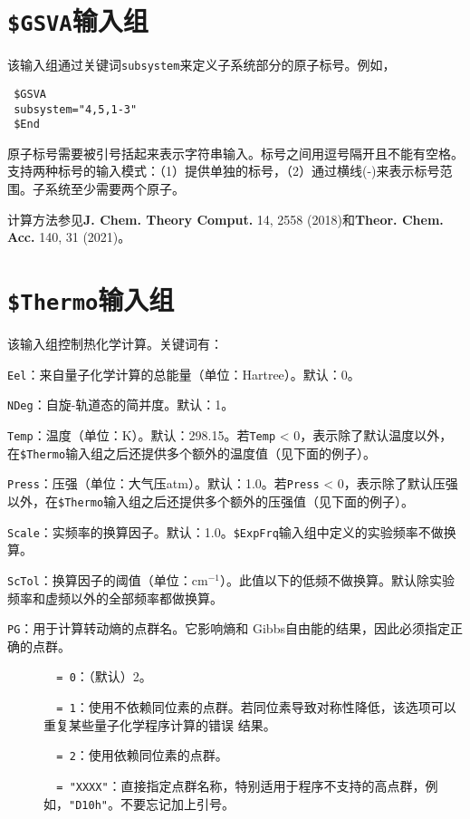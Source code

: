 \documentclass[12pt,a4paper,openany,twoside,cap,UTF8]{ctexbook}
\begin{document}
\section{\texttt{\$GSVA}输入组} \label{sec:inp-gsva}

该输入组通过关键词\verb|subsystem|来定义子系统部分的原子标号。例如，
\begin{colorboxed}[oval=false,boxcolor=blue!75!black,bgcolor=blue!5!white]
\ttfamily
\begin{lstlisting}
 $GSVA
 subsystem="4,5,1-3"
 $End
\end{lstlisting}\end{colorboxed}

原子标号需要被引号括起来表示字符串输入。标号之间用逗号隔开且不能有空格。支持两种标号的输入模式：（1）提供单独的标号，（2）通过横线(-)来表示标号范围。子系统至少需要两个原子。

计算方法参见\textbf{J. Chem. Theory Comput.} 14, 2558 (2018)和\textbf{Theor. Chem. Acc.} 140, 31 (2021)。

\section{\texttt{\$Thermo}输入组} \label{sec:inp-thermo}

该输入组控制热化学计算。关键词有：

\bigskip{}
\verb|Eel|：来自量子化学计算的总能量（单位：Hartree）。默认：0。

\bigskip{}
\verb|NDeg|：自旋-轨道态的简并度。默认：1。

\bigskip{}
\verb|Temp|：温度（单位：K）。默认：298.15。若\verb|Temp| < 0，表示除了默认温度以外，在\texttt{\$Thermo}输入组之后还提供多个额外的温度值（见下面的例子）。

\bigskip{}
\verb|Press|：压强（单位：大气压atm）。默认：1.0。若\verb|Press| < 0，表示除了默认压强以外，在\texttt{\$Thermo}输入组之后还提供多个额外的压强值（见下面的例子）。

\bigskip{}
\verb|Scale|：实频率的换算因子。默认：1.0。\texttt{\$ExpFrq}输入组中定义的实验频率不做换算。

\bigskip{}
\verb|ScTol|：换算因子的阈值（单位：cm$^{-1}$）。此值以下的低频不做换算。默认除实验频率和虚频以外的全部频率都做换算。

\bigskip{}
\verb|PG|：用于计算转动熵的点群名。它影响熵和 Gibbs自由能的结果，因此必须指定正确的点群。
\begin{description}
\item[ ]\verb|  = 0|：（默认）2。
\item[ ]\verb|  = 1|：使用不依赖同位素的点群。若同位素导致对称性降低，该选项可以重复某些量子化学程序计算的错误 结果。
\item[ ]\verb|  = 2|：使用依赖同位素的点群。
\item[ ]\verb|  = "XXXX"|：直接指定点群名称，特别适用于程序不支持的高点群，例如，\verb|"D10h"|。不要忘记加上引号。
\end{description}
\end{document}
